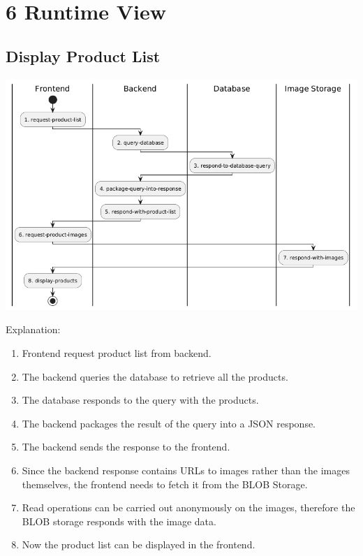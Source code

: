 \hypertarget{section-runtime-view}{%
\section{6 Runtime View}\label{section-runtime-view}}

\hypertarget{__runtime_scenario_1}{%
\subsection{Display Product List}\label{__runtime_scenario_1}}
\includegraphics{images/uml_swimlane_product_list.png}

Explanation:
\begin{enumerate}
  \item Frontend request product list from backend.
  \item The backend queries the database to retrieve all the products.
  \item The database responds to the query with the products.
  \item The backend packages the result of the query into a JSON response.
  \item The backend sends the response to the frontend.
  \item Since the backend response contains URLs to images rather than the images themselves, the frontend needs to fetch it from the BLOB Storage.
  \item Read operations can be carried out anonymously on the images, therefore the BLOB storage responds with the image data.
  \item Now the product list can be displayed in the frontend.
\end{enumerate}


